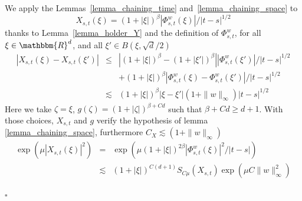 \documentclass[a4paper,11pt]{article}
\newenvironment{proof}{{\sc Proof.}}{\hfill$\square$}
\begin{document}
\begin{proof}
  We apply the Lemmas~\ref{lemma_chaining_time} and~\ref{lemma_chaining_space}
  to
  \[ X_{s,t} ( \xi ) = ( 1+ | \xi | )^{\beta} | \Phi_{s,t}^{w} ( \xi ) | / |
     t-s |^{1/2} \]
  thanks to Lemma~\ref{lemma_holder_Y} and the definition of $\Phi^{w}_{s,t}$,
  for all $\xi \in \mathbbm{R}^{d}$, and all $\xi' \in B \left( \xi , \sqrt{d}
  /2 \right)$
  \begin{eqnarray*}
    | X_{s,t} ( \xi ) -X_{s,t} ( \xi' ) | & \leqslant & | ( 1+ | \xi |
    )^{\beta} - ( 1+ | \xi' | )^{\beta} |   | \Phi^{w}_{s,t} ( \xi' ) | / |
    t-s |^{1/2}\\
    &  & + ( 1+ | \xi | )^{\beta} | \Phi^{w}_{s,t} ( \xi ) - \Phi^{w}_{s,t} (
    \xi' ) | / | t-s |^{1/2}\\
    & \lesssim & ( 1+ | \xi | )^{\beta} | \xi - \xi' | ( 1+ \| w \|_{\infty}
    ) | t-s |^{1/2}
  \end{eqnarray*}
  Here we take $\zeta = \xi$, $g ( \zeta ) = ( 1+ | \zeta | )^{\beta +C d}$
  such that $\beta +C d \geqslant d+1$. With those choices, $X_{s,t}$ and $g$
  verify the hypothesis of lemma \ref{lemma_chaining_space}, furthermore
  $C_{X} \lesssim ( 1+ \| w \|_{\infty} )$
  \begin{eqnarray*}
    \exp ( \mu | X_{s,t} ( \xi ) |^{2} ) & = & \exp ( \mu ( 1+ | \xi | )^{2
    \beta} | \Phi^{w}_{s,t} ( \xi ) |^{2} / | t-s | )\\
    & \lesssim & ( 1+ | \xi | )^{C ( d+1 )} S_{C \mu} ( X_{s,t} ) \exp ( \mu
    C \| w \|_{\infty}^{2} )
  \end{eqnarray*}
  

\end{proof}
\end{document}
